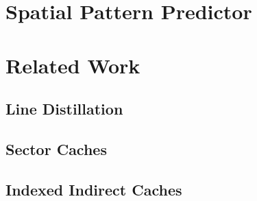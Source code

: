 




\section{Spatial Pattern Predictor}
\section{Related Work}
\subsection{Line Distillation}
\subsection{Sector Caches}
\subsection{Indexed Indirect Caches}
